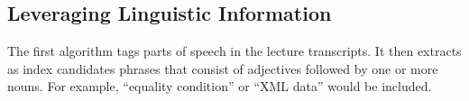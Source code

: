 \subsection{Leveraging Linguistic Information}
\label{sec:useTime}

The first algorithm tags parts of speech in the lecture
transcripts. It then extracts as index candidates phrases that consist
of adjectives followed by one or more nouns. For example, ``equality
condition'' or ``XML data'' would be included.
